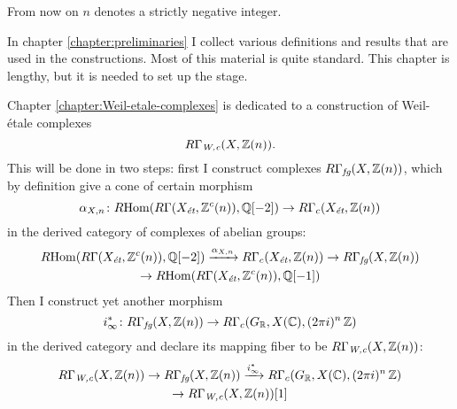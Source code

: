 \vspace{1em}

From now on $n$ denotes a strictly negative integer.

\vspace{1em}

In chapter \ref{chapter:preliminaries} I collect various definitions and results
that are used in the constructions. Most of this material is quite
standard. This chapter is lengthy, but it is needed to set up the stage.

\vspace{1em}

Chapter \ref{chapter:Weil-etale-complexes} is dedicated to a construction of
Weil-étale complexes
$$R\Gamma_\text{\it W,c} (X,\mathbb{Z}(n)).$$
This will be done in two steps: first I construct complexes
$R\Gamma_\text{\it fg} (X, \mathbb{Z} (n))$, which by definition give a cone of certain
morphism
\[ \alpha_{X,n}\colon R\!\operatorname{Hom} (R\Gamma (X_\text{\it ét}, \mathbb{Z}^c (n)), \mathbb{Q} [-2]) \to
  R\Gamma_c (X_\text{\it ét}, \mathbb{Z} (n)) \]
in the derived category of complexes of abelian groups:
\begin{multline*}
  R\!\operatorname{Hom} (R\Gamma (X_\text{\it ét}, \mathbb{Z}^c (n)), \mathbb{Q} [-2]) \xrightarrow{\alpha_{X,n}}
  R\Gamma_c (X_\text{\it ét}, \mathbb{Z} (n)) \to
  R\Gamma_\text{\it fg} (X, \mathbb{Z} (n)) \\
  \to R\!\operatorname{Hom} (R\Gamma (X_\text{\it ét}, \mathbb{Z}^c (n)), \mathbb{Q} [-1])
\end{multline*}
Then I construct yet another morphism
\[ i_\infty^*\colon R\Gamma_\text{\it fg} (X, \mathbb{Z} (n)) \to
  R\Gamma_c (G_{\mathbb{R}}, X (\mathbb{C}), (2\pi i)^n\,\mathbb{Z}) \]
in the derived category and declare its mapping fiber to be
$R\Gamma_\text{\it W,c} (X,\mathbb{Z}(n))$:
\begin{multline*}
  R\Gamma_\text{\it W,c} (X,\mathbb{Z}(n)) \to
  R\Gamma_\text{\it fg} (X, \mathbb{Z} (n)) \xrightarrow{i_\infty^*}
  R\Gamma_c (G_{\mathbb{R}}, X (\mathbb{C}), (2\pi i)^n\,\mathbb{Z}) \\
  \to R\Gamma_\text{\it W,c} (X,\mathbb{Z}(n)) [1]
\end{multline*}

\vspace{1em}

